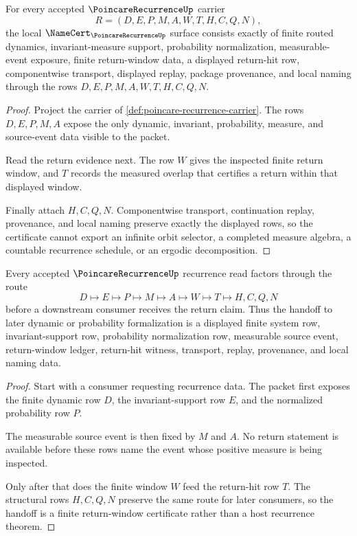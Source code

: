 \begin{theorem}
\label{thm:poincare-recurrence-namecert-obligations}
For every accepted $\PoincareRecurrenceUp$ carrier
$$
R=(D,E,P,M,A,W,T,H,C,Q,N),
$$
the local $\NameCert_{\PoincareRecurrenceUp}$ surface consists exactly of finite routed dynamics, invariant-measure support, probability normalization, measurable-event exposure, finite return-window data, a displayed return-hit row, componentwise transport, displayed replay, package provenance, and local naming through the rows $D,E,P,M,A,W,T,H,C,Q,N$.
\end{theorem}
\begin{proof}
Project the carrier of \autoref{def:poincare-recurrence-carrier}. The rows $D,E,P,M,A$ expose the only dynamic, invariant, probability, measure, and source-event data visible to the packet.

Read the return evidence next. The row $W$ gives the inspected finite return window, and $T$ records the measured overlap that certifies a return within that displayed window.

Finally attach $H,C,Q,N$. Componentwise transport, continuation replay, provenance, and local naming preserve exactly the displayed rows, so the certificate cannot export an infinite orbit selector, a completed measure algebra, a countable recurrence schedule, or an ergodic decomposition.
\end{proof}

\begin{theorem}
\label{thm:poincare-recurrence-return-window-handoff}
Every accepted $\PoincareRecurrenceUp$ recurrence read factors through the route
$$
D\longmapsto E\longmapsto P\longmapsto M\longmapsto A\longmapsto W\longmapsto T\longmapsto H,C,Q,N
$$
before a downstream consumer receives the return claim. Thus the handoff to later dynamic or probability formalization is a displayed finite system row, invariant-support row, probability normalization row, measurable source event, return-window ledger, return-hit witness, transport, replay, provenance, and local naming data.
\end{theorem}
\begin{proof}
Start with a consumer requesting recurrence data. The packet first exposes the finite dynamic row $D$, the invariant-support row $E$, and the normalized probability row $P$.

The measurable source event is then fixed by $M$ and $A$. No return statement is available before these rows name the event whose positive measure is being inspected.

Only after that does the finite window $W$ feed the return-hit row $T$. The structural rows $H,C,Q,N$ preserve the same route for later consumers, so the handoff is a finite return-window certificate rather than a host recurrence theorem.
\end{proof}

